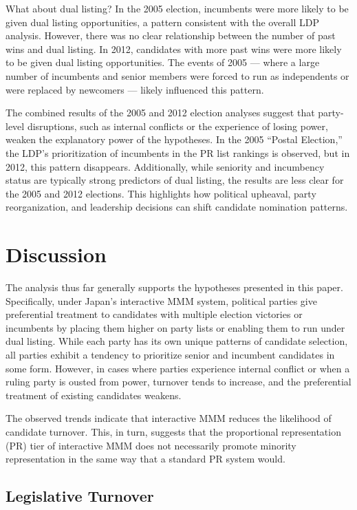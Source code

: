 \documentclass[a4paper, 11pt]{article}
\begin{document}
What about dual listing? In the 2005 election, incumbents were more likely to be given dual listing opportunities, a pattern consistent with the overall LDP analysis. However, there was no clear relationship between the number of past wins and dual listing. In 2012, candidates with more past wins were more likely to be given dual listing opportunities. The events of 2005 — where a large number of incumbents and senior members were forced to run as independents or were replaced by newcomers — likely influenced this pattern.

The combined results of the 2005 and 2012 election analyses suggest that party-level disruptions, such as internal conflicts or the experience of losing power, weaken the explanatory power of the hypotheses. In the 2005 “Postal Election,” the LDP’s prioritization of incumbents in the PR list rankings is observed, but in 2012, this pattern disappears. Additionally, while seniority and incumbency status are typically strong predictors of dual listing, the results are less clear for the 2005 and 2012 elections. This highlights how political upheaval, party reorganization, and leadership decisions can shift candidate nomination patterns.

\section{Discussion} \label{sec: dis}

The analysis thus far generally supports the hypotheses presented in this paper. Specifically, under Japan’s interactive MMM system, political parties give preferential treatment to candidates with multiple election victories or incumbents by placing them higher on party lists or enabling them to run under dual listing. While each party has its own unique patterns of candidate selection, all parties exhibit a tendency to prioritize senior and incumbent candidates in some form. However, in cases where parties experience internal conflict or when a ruling party is ousted from power, turnover tends to increase, and the preferential treatment of existing candidates weakens.

The observed trends indicate that interactive MMM reduces the likelihood of candidate turnover. This, in turn, suggests that the proportional representation (PR) tier of interactive MMM does not necessarily promote minority representation in the same way that a standard PR system would.

\subsection{Legislative Turnover}
\end{document}
